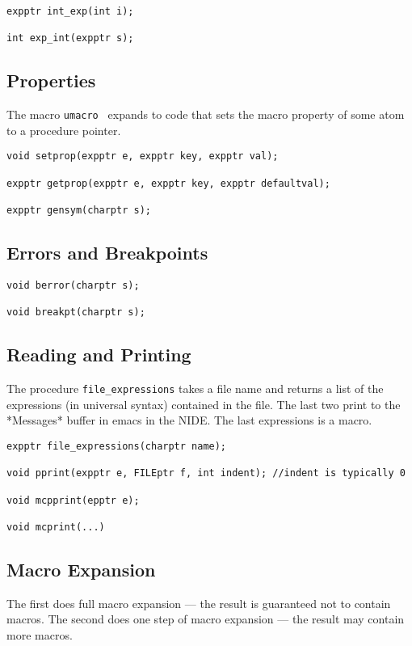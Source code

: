 \documentclass{article}
\begin{document}
\begin{verbatim}
expptr int_exp(int i);

int exp_int(expptr s);
\end{verbatim}

\subsection{Properties}

The macro {\tt umacro } expands to code that
sets the macro property of some atom to a procedure pointer.

\begin{verbatim}
void setprop(expptr e, expptr key, expptr val);

expptr getprop(expptr e, expptr key, expptr defaultval);

expptr gensym(charptr s);
\end{verbatim}

\subsection{Errors and Breakpoints}

\begin{verbatim}
void berror(charptr s);

void breakpt(charptr s);
\end{verbatim}

\subsection{Reading and Printing}
The procedure {\tt file\_expressions} takes a file name and returns a list of the expressions
(in universal syntax) contained in the file.  The last two print to the *Messages* buffer in emacs in the NIDE.
The last expressions is a macro.

\begin{verbatim}
expptr file_expressions(charptr name);

void pprint(expptr e, FILEptr f, int indent); //indent is typically 0

void mcpprint(epptr e);

void mcprint(...)
\end{verbatim}

\subsection{Macro Expansion}
The first does full macro expansion --- the result is guaranteed not to contain macros.
The second does one step of macro expansion --- the result may contain more macros.
\end{document}

